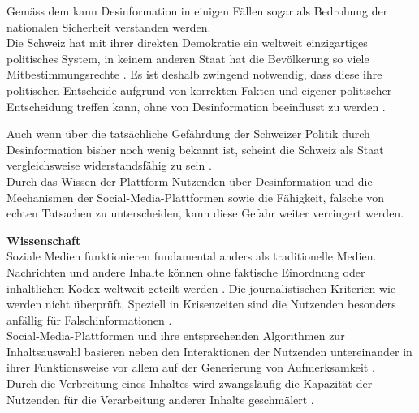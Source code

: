 \documentclass[12pt,a4paper]{article}        %
\begin{document}
Gemäss dem \textcites{bundesministerium_des_innern_und_fur_heimat_desinformation_2022}\parencite[zit.\ nach][15]{teetz_social-media-post_2023} kann Desinformation in einigen Fällen sogar als Bedrohung der nationalen Sicherheit verstanden werden. \\
Die Schweiz hat mit ihrer direkten Demokratie ein weltweit einzigartiges politisches System, in keinem anderen Staat hat die Bevölkerung so viele Mitbestimmungsrechte \parencite[2]{sager_politische_2017}. Es ist deshalb zwingend notwendig, dass diese ihre politischen Entscheide aufgrund von korrekten Fakten und eigener politischer Entscheidung treffen kann, ohne von Desinformation beeinflusst zu werden \parencite[26]{vogler_wahrnehmung_2021} \parencite[vgl.\ auch][14f]{european_parliament_directorate-general_for_external_policies_of_the_union_impact_2021}.

\pagebreak
Auch wenn über die tatsächliche Gefährdung der Schweizer Politik durch Desinformation bisher noch wenig bekannt ist, scheint die Schweiz als Staat vergleichsweise widerstandsfähig zu sein \parencite[26]{vogler_wahrnehmung_2021}.\\
Durch das Wissen der Plattform-Nutzenden über Desinformation und die Mechanismen der Social-Media-Plattformen sowie die Fähigkeit, falsche von echten Tatsachen zu unterscheiden, kann diese Gefahr weiter verringert werden.

\textbf{Wissenschaft} \\
Soziale Medien funktionieren fundamental anders als traditionelle Medien. Nachrichten und andere Inhalte können ohne faktische Einordnung oder inhaltlichen Kodex weltweit geteilt werden \parencites[211]{allcott_social_2017}[25]{moeller_beyond_2018}. Die journalistischen Kriterien wie \parencite[9]{grujic_warnhinweise_2024} werden nicht überprüft. Speziell in Krisenzeiten sind die Nutzenden besonders anfällig für Falschinformationen \parencite[vgl.][2]{ceron_fake_2021}. \\
Social-Media-Plattformen und ihre entsprechenden Algorithmen zur Inhaltsauswahl basieren neben den Interaktionen der Nutzenden untereinander in ihrer Funktionsweise vor allem auf der Generierung von Aufmerksamkeit \parencites[vgl.][220]{schmidt_meinungsbildung_2022}[493]{behnke_manipulation_2018}. \\
Durch die Verbreitung eines Inhaltes wird zwangsläufig die Kapazität der Nutzenden für die Verarbeitung anderer Inhalte geschmälert \parencite[248]{hohlfeld_schlechte_2020}.
\end{document}
